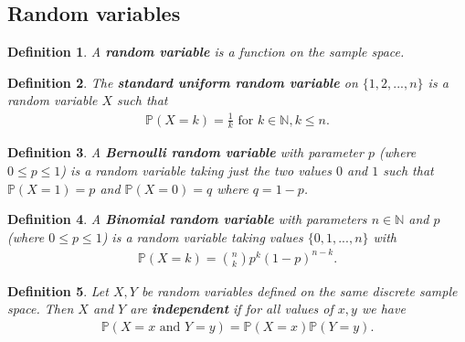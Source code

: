 \documentclass{article}
\theoremstyle{sltheorem}
\newtheorem{definition}{Definition}[section]
\newcommand{\N}{\mathbb{N}}
\renewcommand{\P}{\mathbb{P}}
\newcommand*\B[1]{\textbf{#1}}
\begin{document}
\subsection{Random variables}
\begin{definition}
    A \B{random variable} is a function on the sample space.
\end{definition}
\begin{definition}
    The \B{standard uniform random variable} on $\{1,2,...,n\}$ is a random variable $X$ such that
    \begin{align*}
        \P(X=k)=\frac{1}{k}\text{ for }k\in\N, k\leq n.
    \end{align*}
\end{definition}
\begin{definition}
    A \B{Bernoulli random variable} with parameter $p$ (where $0\leq p\leq 1$) is a random variable
    taking just the two values $0$ and $1$ such that $\P(X=1)=p$ and $\P(X=0)=q$ where $q=1-p$.
\end{definition}
\begin{definition}
    A \B{Binomial random variable} with parameters $n\in\N$ and $p$ (where $0\leq p\leq 1$) is a
    random variable taking values $\{0,1,...,n\}$ with
    \begin{align*}
        \P(X=k)=\binom{n}{k}p^k(1-p)^{n-k}.
    \end{align*}
\end{definition}
\begin{definition}
    Let $X,Y$ be random variables defined on the same discrete sample space. 
    Then $X$ and $Y$ are \B{independent} if for all values of $x,y$ we have
    \begin{align*}
        \P(X=x \text{ and } Y=y) = \P(X=x)\P(Y = y).
    \end{align*}
\end{definition}
\end{document}
